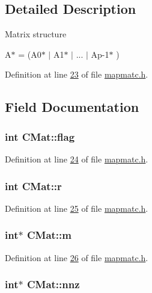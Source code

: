 \subsection{Detailed Description}
Matrix structure \par
 A$\ast$ = (A0$\ast$ $|$ A1$\ast$ $|$ ... $|$ Ap-\/1$\ast$ ) 

Definition at line \hyperlink{mapmatc_8h_source_l00023}{23} of file \hyperlink{mapmatc_8h_source}{mapmatc.\-h}.



\subsection{Field Documentation}
\hypertarget{structCMat_a60c04e2249af43059a609a437205bead}{
\subsubsection[{flag}]{\setlength{\rightskip}{0pt plus 5cm}int C\-Mat\-::flag}}\label{structCMat_a60c04e2249af43059a609a437205bead}


Definition at line \hyperlink{mapmatc_8h_source_l00024}{24} of file \hyperlink{mapmatc_8h_source}{mapmatc.\-h}.

\hypertarget{structCMat_aaa75f5afbded481f194bfff507ebe551}{
\subsubsection[{r}]{\setlength{\rightskip}{0pt plus 5cm}int C\-Mat\-::r}}\label{structCMat_aaa75f5afbded481f194bfff507ebe551}


Definition at line \hyperlink{mapmatc_8h_source_l00025}{25} of file \hyperlink{mapmatc_8h_source}{mapmatc.\-h}.

\hypertarget{structCMat_a6837ab815749a87fa96084527166b564}{
\subsubsection[{m}]{\setlength{\rightskip}{0pt plus 5cm}int$\ast$ C\-Mat\-::m}}\label{structCMat_a6837ab815749a87fa96084527166b564}


Definition at line \hyperlink{mapmatc_8h_source_l00026}{26} of file \hyperlink{mapmatc_8h_source}{mapmatc.\-h}.

\hypertarget{structCMat_abaaf4cbc8c0c1a456f3fc13ee3a6b5b9}{
\subsubsection[{nnz}]{\setlength{\rightskip}{0pt plus 5cm}int$\ast$ C\-Mat\-::nnz}}\label{structCMat_abaaf4cbc8c0c1a456f3fc13ee3a6b5b9}


